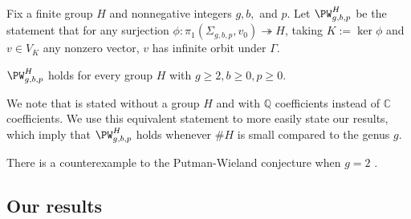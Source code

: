 \begin{definition}
\notready
	\label{definition:pw}
	Fix a finite group $H$ and nonnegative integers $g, b,$ and $p$.
	Let $\PW_{g,b,p}^H$ be the statement that for any
	surjection $\phi: \pi_1(\Sigma_{g,b,p}, v_0) \twoheadrightarrow
	H$, taking $K := \ker \phi$ and $v \in V_K$ any nonzero vector,
	$v$ has infinite orbit under $\Gamma$.
\end{definition}

\begin{conjecture}
	\label{conjecture:putman-wieland}
	$\PW_{g,b,p}^H$ holds for every group $H$ with $g \geq 2, b \geq 0, p \geq 0$.
\end{conjecture}

\begin{remark}
\notready
\label{remark:putman-wieland-differences}
We note that
\cite[Conjecture 1.2]{putmanW:abelian-quotients}
is stated without a group $H$ and with $\mathbb Q$ coefficients instead of
$\mathbb C$ coefficients.
We use this equivalent statement to more easily state our results,
which imply that
$\PW_{g,b,p}^H$ holds whenever $\# H$ is small compared to the genus $g$.
\end{remark}
\begin{remark}
\notready
	\label{remark:}
	There is a counterexample to the Putman-Wieland conjecture when $g = 2$ \cite[Theorem 1.3]{markovic}.
\end{remark}


\subsection{Our results}

